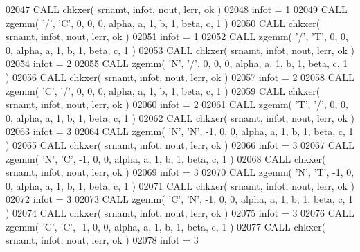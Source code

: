 \begin{DoxyCode}
02047       \textcolor{keyword}{CALL }chkxer( srnamt, infot, nout, lerr, ok )
02048       infot = 1
02049       \textcolor{keyword}{CALL }zgemm( \textcolor{stringliteral}{'/'}, \textcolor{stringliteral}{'C'}, 0, 0, 0, alpha, a, 1, b, 1, beta, c, 1 )
02050       \textcolor{keyword}{CALL }chkxer( srnamt, infot, nout, lerr, ok )
02051       infot = 1
02052       \textcolor{keyword}{CALL }zgemm( \textcolor{stringliteral}{'/'}, \textcolor{stringliteral}{'T'}, 0, 0, 0, alpha, a, 1, b, 1, beta, c, 1 )
02053       \textcolor{keyword}{CALL }chkxer( srnamt, infot, nout, lerr, ok )
02054       infot = 2
02055       \textcolor{keyword}{CALL }zgemm( \textcolor{stringliteral}{'N'}, \textcolor{stringliteral}{'/'}, 0, 0, 0, alpha, a, 1, b, 1, beta, c, 1 )
02056       \textcolor{keyword}{CALL }chkxer( srnamt, infot, nout, lerr, ok )
02057       infot = 2
02058       \textcolor{keyword}{CALL }zgemm( \textcolor{stringliteral}{'C'}, \textcolor{stringliteral}{'/'}, 0, 0, 0, alpha, a, 1, b, 1, beta, c, 1 )
02059       \textcolor{keyword}{CALL }chkxer( srnamt, infot, nout, lerr, ok )
02060       infot = 2
02061       \textcolor{keyword}{CALL }zgemm( \textcolor{stringliteral}{'T'}, \textcolor{stringliteral}{'/'}, 0, 0, 0, alpha, a, 1, b, 1, beta, c, 1 )
02062       \textcolor{keyword}{CALL }chkxer( srnamt, infot, nout, lerr, ok )
02063       infot = 3
02064       \textcolor{keyword}{CALL }zgemm( \textcolor{stringliteral}{'N'}, \textcolor{stringliteral}{'N'}, -1, 0, 0, alpha, a, 1, b, 1, beta, c, 1 )
02065       \textcolor{keyword}{CALL }chkxer( srnamt, infot, nout, lerr, ok )
02066       infot = 3
02067       \textcolor{keyword}{CALL }zgemm( \textcolor{stringliteral}{'N'}, \textcolor{stringliteral}{'C'}, -1, 0, 0, alpha, a, 1, b, 1, beta, c, 1 )
02068       \textcolor{keyword}{CALL }chkxer( srnamt, infot, nout, lerr, ok )
02069       infot = 3
02070       \textcolor{keyword}{CALL }zgemm( \textcolor{stringliteral}{'N'}, \textcolor{stringliteral}{'T'}, -1, 0, 0, alpha, a, 1, b, 1, beta, c, 1 )
02071       \textcolor{keyword}{CALL }chkxer( srnamt, infot, nout, lerr, ok )
02072       infot = 3
02073       \textcolor{keyword}{CALL }zgemm( \textcolor{stringliteral}{'C'}, \textcolor{stringliteral}{'N'}, -1, 0, 0, alpha, a, 1, b, 1, beta, c, 1 )
02074       \textcolor{keyword}{CALL }chkxer( srnamt, infot, nout, lerr, ok )
02075       infot = 3
02076       \textcolor{keyword}{CALL }zgemm( \textcolor{stringliteral}{'C'}, \textcolor{stringliteral}{'C'}, -1, 0, 0, alpha, a, 1, b, 1, beta, c, 1 )
02077       \textcolor{keyword}{CALL }chkxer( srnamt, infot, nout, lerr, ok )
02078       infot = 3

\end{DoxyCode}

